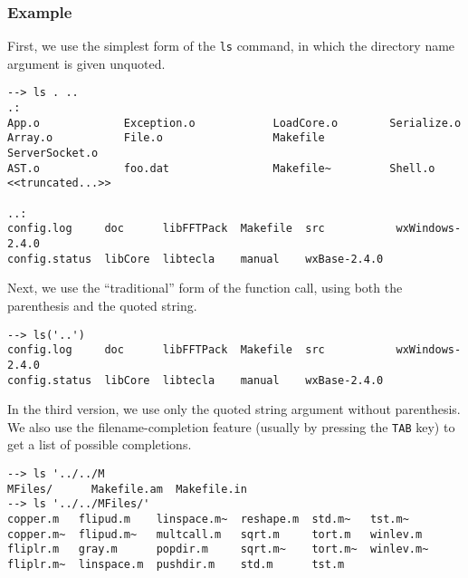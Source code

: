 \subsubsection{Example}
First, we use the simplest form of the \verb|ls| command, in which the directory name argument is given unquoted.
\begin{verbatim}
--> ls . ..
.:
App.o             Exception.o            LoadCore.o        Serialize.o
Array.o           File.o                 Makefile          ServerSocket.o
AST.o             foo.dat                Makefile~         Shell.o
<<truncated...>>

..:
config.log     doc      libFFTPack  Makefile  src           wxWindows-2.4.0
config.status  libCore  libtecla    manual    wxBase-2.4.0
\end{verbatim}
Next, we use the ``traditional'' form of the function call, using both the parenthesis and the quoted string.
\begin{verbatim}
--> ls('..')
config.log     doc      libFFTPack  Makefile  src           wxWindows-2.4.0
config.status  libCore  libtecla    manual    wxBase-2.4.0
\end{verbatim}
In the third version, we use only the quoted string argument without parenthesis.  We also use the filename-completion feature (usually by pressing the \verb|TAB| key) to get a list of possible completions.
\begin{verbatim}
--> ls '../../M
MFiles/      Makefile.am  Makefile.in
--> ls '../../MFiles/'
copper.m   flipud.m    linspace.m~  reshape.m  std.m~   tst.m~
copper.m~  flipud.m~   multcall.m   sqrt.m     tort.m   winlev.m
fliplr.m   gray.m      popdir.m     sqrt.m~    tort.m~  winlev.m~
fliplr.m~  linspace.m  pushdir.m    std.m      tst.m
\end{verbatim}
